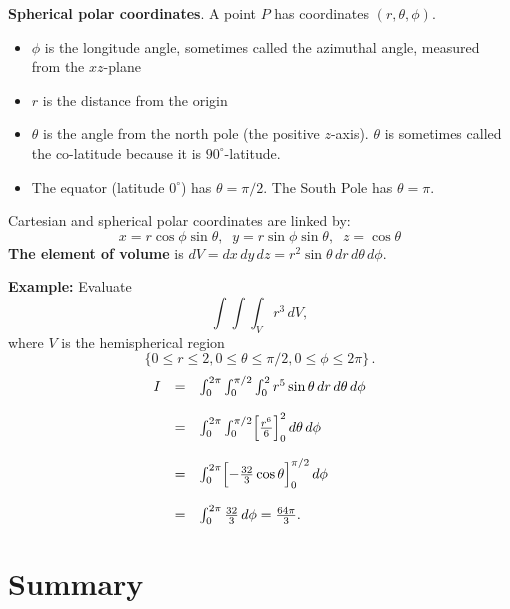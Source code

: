 \documentclass{article}
\begin{document}
\textbf{Spherical polar coordinates}. A point $P$ has coordinates $(r, \theta,
\phi)$. 
\begin{itemize}
\item
$\phi$ is the longitude angle, sometimes called the azimuthal angle, measured from the
$xz$-plane
\item
$r$ is the distance from the origin
\item
$\theta$ is the angle from the north pole (the positive $z$-axis). $\theta$ is
sometimes called the co-latitude because it is
$90^{\circ}$-latitude. 
\item
The equator (latitude $0^{\circ}$) has
$\theta = \pi/2$. The South Pole has $\theta = \pi$. 
\end{itemize}
Cartesian and spherical polar coordinates are linked by:
$$
x=r \cos \phi \sin \theta, \;\; y=r \sin \phi \sin \theta, \;\;
z=\cos \theta
$$
{\bf The element of volume} is $dV = dx \, dy \, dz= r^2 \sin \theta \, dr
\, d \theta \, d \phi$.

%


\textbf{Example:}  Evaluate
$$
\int \int \int_V r^3 \,dV,
$$
where $V$ is the hemispherical region 
$$
\lbrace 0 \leq r \leq 2, 0 \leq \theta \leq 
\pi / 2, 0 \leq \phi \leq 2 \pi \rbrace\,.
$$
$$
\begin{array}{lll}
I & = & \int_{0}^{2 \pi} \int_0^{\pi /2} \int_0^2 r^5 \sin \theta \, dr \, d \theta \, d \phi\\
\\
 & = & \int_{0}^{2 \pi} \int_0^{ \pi /2 } \Bigl[ \frac{r^6}{6} \Bigr]_0^2 \, d \theta \, d \phi \\
 \\
 & = & \int_{0}^{2 \pi} \Bigl[ - \frac{32}{3} \cos \theta \Bigr]_0^{ \pi /2} \, d \phi \\
 \\
  & = &  \int_{0}^{2 \pi} \frac{32}{3} \, d\phi = \frac{64\pi}{3}.
\end{array}
$$


\section*{Summary}
\end{document}
